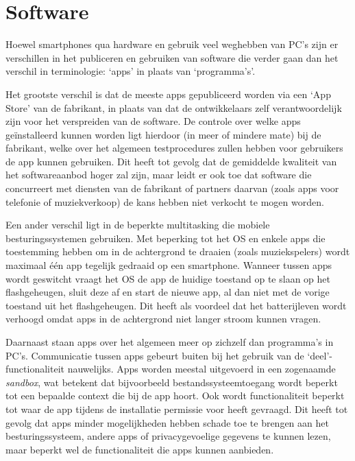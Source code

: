\section{Software}

Hoewel smartphones qua hardware en gebruik veel weghebben van PC's zijn er verschillen in het publiceren en gebruiken van software die verder gaan dan het verschil in terminologie: `apps' in plaats van `programma's'.

Het grootste verschil is dat de meeste apps gepubliceerd worden via een `App Store' van de fabrikant, in plaats van dat de ontwikkelaars zelf verantwoordelijk zijn voor het verspreiden van de software.
De controle over welke apps ge\"installeerd kunnen worden ligt hierdoor (in meer of mindere mate) bij de fabrikant, welke over het algemeen testprocedures zullen hebben voor gebruikers de app kunnen gebruiken.
Dit heeft tot gevolg dat de gemiddelde kwaliteit van het softwareaanbod hoger zal zijn, maar leidt er ook toe dat software die concurreert met diensten van de fabrikant of partners daarvan (zoals apps voor telefonie of muziekverkoop) de kans hebben niet verkocht te mogen worden.

Een ander verschil ligt in de beperkte multitasking die mobiele besturingssystemen gebruiken.
Met beperking tot het OS en enkele apps die toestemming hebben om in de achtergrond te draaien (zoals muziekspelers) wordt maximaal \'e\'en app tegelijk gedraaid op een smartphone.
Wanneer tussen apps wordt geswitcht vraagt het OS de app de huidige toestand op te slaan op het flashgeheugen, sluit deze af en start de nieuwe app, al dan niet met de vorige toestand uit het flashgeheugen.
Dit heeft als voordeel dat het batterijleven wordt verhoogd omdat apps in de achtergrond niet langer stroom kunnen vragen. \citep{extremetechmulti}

Daarnaast staan apps over het algemeen meer op zichzelf dan programma's in PC's.
Communicatie tussen apps gebeurt buiten bij het gebruik van de `deel'-functionaliteit nauwelijks.
Apps worden meestal uitgevoerd in een zogenaamde \emph{sandbox}, wat betekent dat bijvoorbeeld bestandssysteemtoegang wordt beperkt tot een bepaalde context die bij de app hoort.
Ook wordt functionaliteit beperkt tot waar de app tijdens de installatie permissie voor heeft gevraagd.
Dit heeft tot gevolg dat apps minder mogelijkheden hebben schade toe te brengen aan het besturingssysteem, andere apps of privacygevoelige gegevens te kunnen lezen, maar beperkt wel de functionaliteit die apps kunnen aanbieden.
